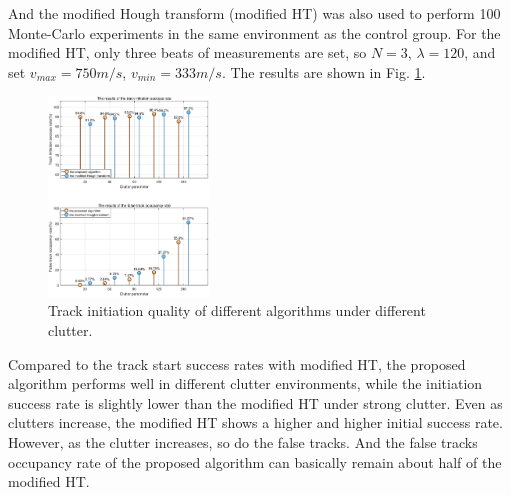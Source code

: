 \documentclass[default,iicol]{sn-jnl}%
\theoremstyle{thmstyleone}%
\theoremstyle{thmstyletwo}%
\theoremstyle{thmstylethree}%
\begin{document}
And the modified Hough transform (modified HT) \cite{bib22} was also used to perform 100 Monte-Carlo experiments in the same environment as the control group. For the modified HT, only three beats of measurements are set, so $N\!=\!3$, $\lambda\!=\!120$, and set $v_{max}\!=\!750m/s$, $v_{min}\!=\!333m/s$. The results are shown in Fig. \ref{fig12}.
\begin{figure}[h]%
    \vspace{-0.5cm}
    \setlength{\abovedisplayskip}{-0.2cm}
    \setlength{\belowcaptionskip}{-1cm}
    \centering
    \includegraphics[width=0.38\textwidth]{fig12.eps}
    \caption{Track initiation quality of different algorithms under different clutter.}\label{fig12}
\end{figure}

Compared to the track start success rates with modified HT, the proposed algorithm performs well in different clutter environments, while the initiation success rate is slightly lower than the modified HT under strong clutter. Even as clutters increase, the modified HT shows a higher and higher initial success rate. However, as the clutter increases, so do the false tracks. And the false tracks occupancy rate of the proposed algorithm can basically remain about half of the modified HT.
\end{document}
